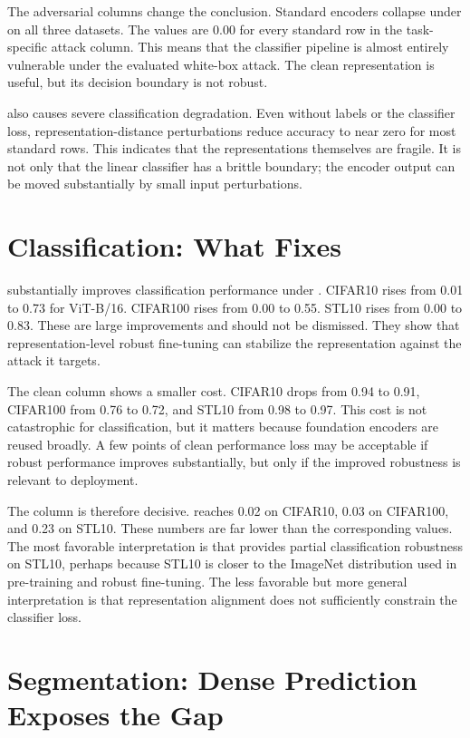 The adversarial columns change the conclusion. Standard encoders collapse under \PGD on all three datasets. The values are 0.00 for every standard row in the task-specific attack column. This means that the classifier pipeline is almost entirely vulnerable under the evaluated white-box attack. The clean representation is useful, but its decision boundary is not robust.

\EmbedAttack also causes severe classification degradation. Even without labels or the classifier loss, representation-distance perturbations reduce accuracy to near zero for most standard rows. This indicates that the representations themselves are fragile. It is not only that the linear classifier has a brittle boundary; the encoder output can be moved substantially by small input perturbations.

\section{Classification: What \DeACL Fixes}

\DeACL substantially improves classification performance under \EmbedAttack. CIFAR10 rises from 0.01 to 0.73 for \DINO ViT-B/16. CIFAR100 rises from 0.00 to 0.55. STL10 rises from 0.00 to 0.83. These are large improvements and should not be dismissed. They show that representation-level robust fine-tuning can stabilize the representation against the attack it targets.

The clean column shows a smaller cost. CIFAR10 drops from 0.94 to 0.91, CIFAR100 from 0.76 to 0.72, and STL10 from 0.98 to 0.97. This cost is not catastrophic for classification, but it matters because foundation encoders are reused broadly. A few points of clean performance loss may be acceptable if robust performance improves substantially, but only if the improved robustness is relevant to deployment.

The \PGD column is therefore decisive. \DeACL reaches 0.02 on CIFAR10, 0.03 on CIFAR100, and 0.23 on STL10. These numbers are far lower than the corresponding \EmbedAttack values. The most favorable interpretation is that \DeACL provides partial classification robustness on STL10, perhaps because STL10 is closer to the ImageNet distribution used in pre-training and robust fine-tuning. The less favorable but more general interpretation is that representation alignment does not sufficiently constrain the classifier loss.

\section{Segmentation: Dense Prediction Exposes the Gap}

